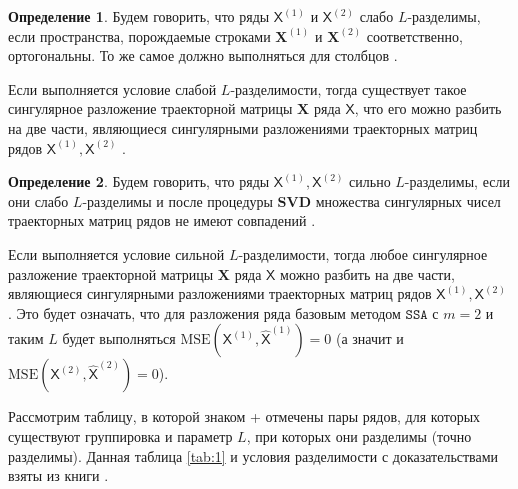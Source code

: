 \documentclass[12pt, specialist, subf
]{disser}
\theoremstyle{definition}
\newcommand{\SSA}{\texttt{SSA}}
\newcommand{\TS}{\mathsf{X}}
\newtheorem{definition}{Определение} %
\begin{document}
\begin{definition}
	Будем говорить, что ряды $\TS^{(1)}$ и $\TS^{(2)}$ слабо $L$-разделимы, если пространства, порождаемые строками $\mathbf{X}^{(1)}$ и $\mathbf{X}^{(2)}$ соответственно, ортогональны. То же самое должно выполняться для столбцов \cite{golyandina2001analysis}.
\end{definition}

Если выполняется условие слабой $L$-разделимости, тогда существует такое сингулярное разложение траекторной матрицы $\mathbf X$ ряда $\TS$, что его можно разбить на две части, являющиеся сингулярными разложениями траекторных матриц рядов $\TS^{(1)}, \TS^{(2)}$ \cite{golyandina2001analysis}.

\begin{definition}
	Будем говорить, что ряды $\TS^{(1)}, \TS^{(2)}$ сильно $L$-разделимы, если они слабо $L$-разделимы и после процедуры $\mathbf{SVD}$ множества сингулярных чисел траекторных матриц рядов не имеют совпадений \cite{golyandina2001analysis}.
\end{definition}

Если выполняется условие сильной $L$-разделимости, тогда любое сингулярное разложение траекторной матрицы $\mathbf X$ ряда $\TS$ можно разбить на две части, являющиеся сингулярными разложениями траекторных матриц рядов $\TS^{(1)}, \TS^{(2)}$ \cite{golyandina2001analysis}. Это будет означать, что для разложения ряда базовым методом $\SSA$ с $m = 2$ и таким $L$ будет выполняться
\( \mathrm{MSE}\left(\TS^{(1)}, \hat{\TS}^{(1)}\right) = 0 \) (а значит и \( \mathrm{MSE}\left(\TS^{(2)}, \hat{\TS}^{(2)}\right) = 0 \)).


Рассмотрим таблицу, в которой знаком + отмечены пары рядов, для которых существуют группировка и параметр $L$, при которых они разделимы (точно разделимы). Данная таблица \ref{tab:1} и условия разделимости с доказательствами взяты из книги \cite{golyandina2001analysis}.

\begin{table}[H]
	\begin{center}
		\caption{Точная разделимость}
		\label{tab:1}
	\end{center}
\end{table}
\end{document}
